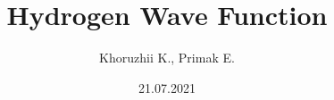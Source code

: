 \documentclass[]{beamer}
\title[Hydrogen orbitals]{Hydrogen Wave Function}
\author{
Khoruzhii K., Primak E.}
\institute[MIPT]
\begin{document}
\date{21.07.2021}
\maketitle




% 

% 

% 


% 
% 
% 

% 

% 

% 

% 


\end{document}
